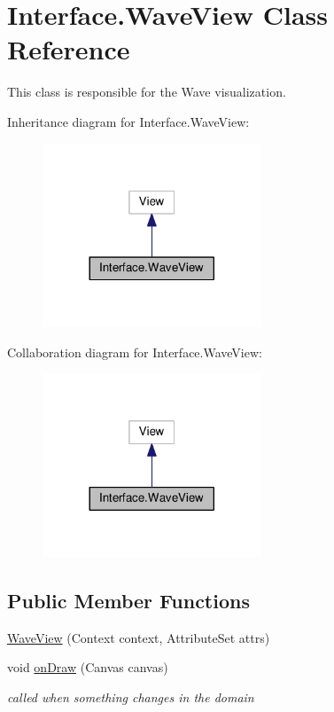 \hypertarget{classInterface_1_1WaveView}{}\section{Interface.\+Wave\+View Class Reference}
\label{classInterface_1_1WaveView}


This class is responsible for the Wave visualization.  




Inheritance diagram for Interface.\+Wave\+View\+:
\nopagebreak
\begin{figure}[H]
\begin{center}
\leavevmode
\includegraphics[width=185pt]{classInterface_1_1WaveView__inherit__graph}
\end{center}
\end{figure}


Collaboration diagram for Interface.\+Wave\+View\+:
\nopagebreak
\begin{figure}[H]
\begin{center}
\leavevmode
\includegraphics[width=185pt]{classInterface_1_1WaveView__coll__graph}
\end{center}
\end{figure}
\subsection*{Public Member Functions}
\begin{DoxyCompactItemize}
\item 
\hyperlink{classInterface_1_1WaveView_ab12eb402db268e5d1eea46a200e2cd6e}{Wave\+View} (Context context, Attribute\+Set attrs)
\item 
void \hyperlink{classInterface_1_1WaveView_a64f5d606e242906e59c2909715d5dbf4}{on\+Draw} (Canvas canvas)
\begin{DoxyCompactList}\small\item\em called when something changes in the domain \end{DoxyCompactList}\end{DoxyCompactItemize}
